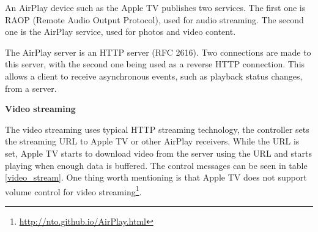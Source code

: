 An AirPlay device such as the Apple TV publishes two services. The first one is 
RAOP (Remote Audio Output Protocol), used for audio streaming. The second 
one is the AirPlay service, used for photos and video content.

The AirPlay server is an HTTP server (RFC 2616). Two connections are made to this 
server, with the second one being used as a reverse HTTP connection. This allows a 
client to receive asynchronous events, such as playback status changes, from a 
server.

\textbf{Video streaming}

The video streaming uses typical HTTP streaming technology, the controller sets 
the streaming URL to Apple TV or other AirPlay receivers. While the URL is set, 
Apple TV starts to download video from the server using the URL and starts 
playing when enough data is buffered. The control messages can be seen in 
table \ref{video_stream}. One thing worth mentioning is that Apple TV does
not support volume control for video
streaming\footnote{\url{http://nto.github.io/AirPlay.html}}.

\begin{table}[htb] 
\caption{AirPlay Video Control HTTP requests \label{video_stream}} 
\begin{center} 
\end{center} 
\end{table} 

